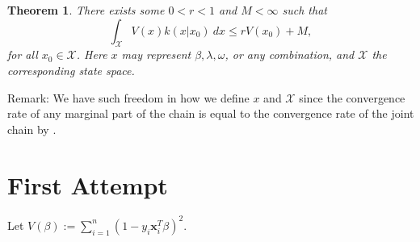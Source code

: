 \documentclass[12pt]{article}
\newtheorem{theorem}{Theorem}
\begin{document}
\begin{theorem}
  There exists some $0 < r < 1$ and $M < \infty$ such that 
  \[
    \int_{\mathcal{X}} V(x)k(x|x_0)\ dx \leq r V(x_0) + M,
  \]
  for all $x_0 \in \mathcal{X}$. Here $x$ may represent $\beta, \lambda, \omega$, or any combination, and $\mathcal{X}$ the corresponding state space.
  \label{thm1}
\end{theorem}

Remark: We have such freedom in how we define $x$ and $\mathcal{X}$ since the convergence rate of any marginal part of the chain is equal to the convergence rate
of the joint chain by \cite{jointvmarg}.

\section{First Attempt}

Let $V(\beta) := \sum_{i=1}^{n}(1 - y_i\bm{x}_i^T\beta)^2$. \\
\end{document}
